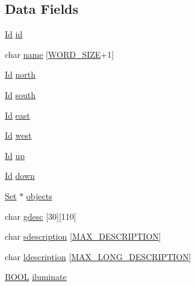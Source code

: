 \subsection*{Data Fields}
\begin{DoxyCompactItemize}
\item 
\hyperlink{types_8h_a845e604fb28f7e3d97549da3448149d3}{Id} \hyperlink{struct__Space_a70cb461deb9ac073e401b607339b567f}{id}
\item 
char \hyperlink{struct__Space_aa1c9c994c2d16ecf3ef46138685fdfdc}{name} \mbox{[}\hyperlink{types_8h_a92ed8507d1cd2331ad09275c5c4c1c89}{W\+O\+R\+D\+\_\+\+S\+I\+ZE}+1\mbox{]}
\item 
\hyperlink{types_8h_a845e604fb28f7e3d97549da3448149d3}{Id} \hyperlink{struct__Space_ae5ebe53ce79514d7d2d93911e0159252}{north}
\item 
\hyperlink{types_8h_a845e604fb28f7e3d97549da3448149d3}{Id} \hyperlink{struct__Space_a646b68c22a0bbf1685033c96109d31d1}{south}
\item 
\hyperlink{types_8h_a845e604fb28f7e3d97549da3448149d3}{Id} \hyperlink{struct__Space_a41ce2bf33cf0c157b358221f094ee05b}{east}
\item 
\hyperlink{types_8h_a845e604fb28f7e3d97549da3448149d3}{Id} \hyperlink{struct__Space_a20c1d259e93b44e24ba82982e142eb9b}{west}
\item 
\hyperlink{types_8h_a845e604fb28f7e3d97549da3448149d3}{Id} \hyperlink{struct__Space_af2a50145d93dfb8d82b8b42138dc57a1}{up}
\item 
\hyperlink{types_8h_a845e604fb28f7e3d97549da3448149d3}{Id} \hyperlink{struct__Space_ac20194f418676bb03cca7e0fdcb6f559}{down}
\item 
\hyperlink{set_8h_a6d3b7f7c92cbb4577ef3ef7ddbf93161}{Set} $\ast$ \hyperlink{struct__Space_a661ed8b0fc8085b6db70188aa5085625}{objects}
\item 
char \hyperlink{struct__Space_a60637342523b393b7cae073324f57be2}{gdesc} \mbox{[}30\mbox{]}\mbox{[}110\mbox{]}
\item 
char \hyperlink{struct__Space_af8b371dd53e49a83a287175f0e686245}{sdescription} \mbox{[}\hyperlink{types_8h_a2b9d4cb1200ff8c085b0a4902e0d7229}{M\+A\+X\+\_\+\+D\+E\+S\+C\+R\+I\+P\+T\+I\+ON}\mbox{]}
\item 
char \hyperlink{struct__Space_a6cf737a07c4a3cd79aa80062a06d73d3}{ldescription} \mbox{[}\hyperlink{types_8h_a3a96a0e39038d30582bfa0cf12e87f0c}{M\+A\+X\+\_\+\+L\+O\+N\+G\+\_\+\+D\+E\+S\+C\+R\+I\+P\+T\+I\+ON}\mbox{]}
\item 
\hyperlink{types_8h_a3e5b8192e7d9ffaf3542f1210aec18dd}{B\+O\+OL} \hyperlink{struct__Space_a3e7f0cd158600936103895aa2bb9f0b4}{iluminate}
\end{DoxyCompactItemize}


